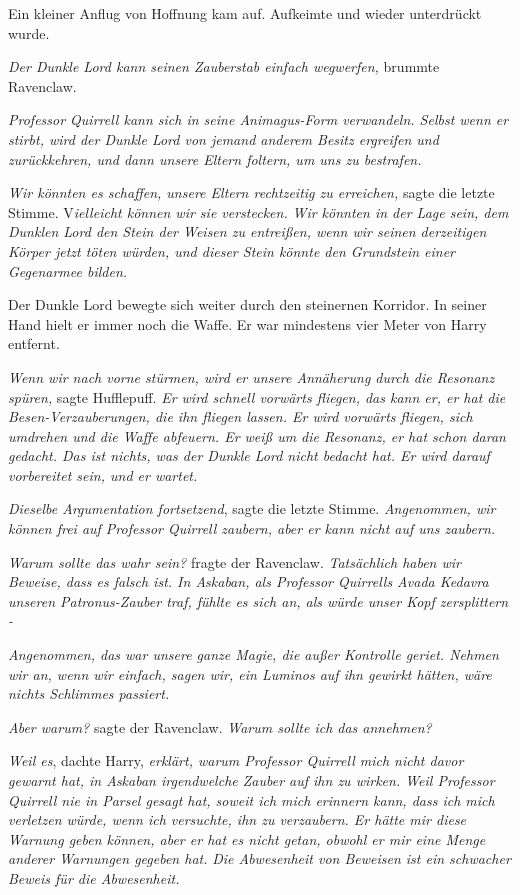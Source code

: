 {Ein kleiner Anflug von Hoffnung kam auf. Aufkeimte und wieder unterdrückt wurde.

\emph{Der Dunkle Lord kann seinen Zauberstab einfach wegwerfen,} brummte Ravenclaw.

\emph{Professor Quirrell kann sich in seine Animagus-Form verwandeln. Selbst wenn er stirbt, wird der Dunkle Lord von jemand anderem Besitz ergreifen und zurückkehren, und dann unsere Eltern foltern, um uns zu bestrafen.}

\emph{\hfill\break Wir könnten es schaffen, unsere Eltern rechtzeitig zu erreichen,} sagte die letzte Stimme. V\emph{ielleicht können wir sie verstecken.} \emph{Wir könnten in der Lage sein, dem Dunklen Lord den Stein der Weisen zu entreißen, wenn wir seinen derzeitigen Körper jetzt töten würden, und dieser Stein könnte den Grundstein einer Gegenarmee bilden.}

Der Dunkle Lord bewegte sich weiter durch den steinernen Korridor. In seiner Hand hielt er immer noch die Waffe. Er war mindestens vier Meter von Harry entfernt.

\emph{Wenn wir nach vorne stürmen, wird er unsere Annäherung durch die Resonanz spüren,} sagte Hufflepuff. \emph{Er wird schnell vorwärts fliegen, das kann er, er hat die Besen-Verzauberungen, die ihn fliegen lassen. Er wird vorwärts fliegen, sich umdrehen und die Waffe abfeuern. Er weiß um die Resonanz, er hat schon daran gedacht. Das ist nichts, was der Dunkle Lord nicht bedacht hat. Er wird darauf vorbereitet sein, und er wartet.}

\emph{Dieselbe Argumentation fortsetzend}, sagte die letzte Stimme. \emph{Angenommen, wir können frei auf Professor Quirrell zaubern, aber er kann nicht auf uns zaubern.}

\emph{\hfill\break Warum sollte das wahr sein?} fragte der Ravenclaw. \emph{Tatsächlich haben wir Beweise, dass es falsch ist. In Askaban, als Professor Quirrells Avada Kedavra unseren Patronus-Zauber traf, fühlte es sich an, als würde unser Kopf zersplittern -}

\emph{Angenommen, das war unsere ganze Magie, die außer Kontrolle geriet. Nehmen wir an, wenn wir einfach, sagen wir, ein Luminos auf ihn gewirkt hätten, wäre nichts Schlimmes passiert.}

\emph{Aber warum?} sagte der Ravenclaw. \emph{Warum sollte ich das annehmen?}

\emph{Weil es}, dachte Harry, \emph{erklärt, warum Professor Quirrell mich nicht davor gewarnt hat, in Askaban irgendwelche Zauber auf ihn zu wirken. Weil Professor Quirrell nie in Parsel gesagt hat, soweit ich mich erinnern kann, dass ich mich verletzen würde, wenn ich versuchte, ihn zu verzaubern. Er hätte mir diese Warnung geben können, aber er hat es nicht getan, obwohl er mir eine Menge anderer Warnungen gegeben hat.} \emph{Die Abwesenheit von Beweisen ist ein schwacher Beweis für die Abwesenheit.}

}
